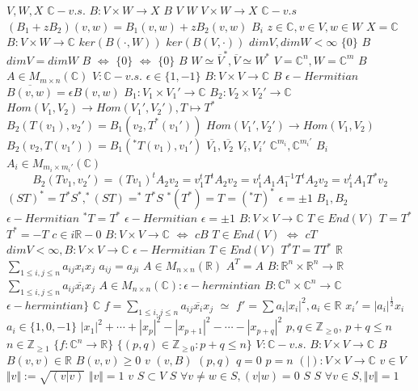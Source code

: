 \documentclass{article}
\begin{document}
$V,W,X$
$\mathbb{C}-v.s.$
$B:V\times W\rightarrow X$
$B$
$V$
$W$
$V\times W \rightarrow X$
$\mathbb{C}-v.s$
$(B_1+zB_2)(v,w)=B_1(v,w)+zB_2(v,w)$
$B_i$
$z \in \mathbb{C},v\in V,w\in W$
$X=\mathbb{C}$
$B:V\times W \rightarrow \mathbb{C}$
$ker(B(\cdot,W))$
$ker(B(V,\cdot))$
$dimV,dimW<\infty$
$\{0\}$
$B$
$dimV=dimW$
$B$
$\Longleftrightarrow$
$\{0\}$
$\Longleftrightarrow$
$\{0\}$
$B$
$W\simeq \overline{V}^*,\overline{V}\simeq W^*$
$V=\mathbb{C}^n,W=\mathbb{C}^m$
$B$
$A\in M_{m\times n}(\mathbb{C})$
$V:\mathbb{C}-v.s.$
$\epsilon\in \{1,-1\}$
$B:V\times V\rightarrow \mathbb{C}$
$B$
$\epsilon-Hermitian$
$\overline{B(v,w)}=\epsilon B(v,w)$
$B_1:V_1\times V_1' \rightarrow \mathbb{C}$
$B_2:V_2\times V_2' \rightarrow \mathbb{C}$
$Hom(V_1,V_2) \rightarrow Hom(V_1',V_2'),T\mapsto T^*$
$B_2(T(v_1),v_2')=B_1(v_2,T^*(v_1'))$
$Hom(V_1',V_2')\rightarrow Hom(V_1,V_2)$
$B_2(v_2, T(v_1'))=B_1(^*T(v_1),v_1')$
$\overline{V_1},\overline{V_2}$
$V_i,V_i'$
$\mathbb{C}^{m_i},\mathbb{C}^{m_i'}$
$B_i$
$A_i \in M_{m_i\times m_i'}(\mathbb{C})$
$$B_2(Tv_1,v_2')=(Tv_1)^tA_2v_2=v_1^tT^tA_2v_2=v_1^tA_1A_1^{-1}T^tA_2v_2=v_1^tA_1T^*v_2$$
$(ST)^*=T^*S^*,^*(ST)=^*T^*S$
$^*(T^*)=T=(^*T)^*$
$\epsilon=\pm 1$
$B_1,B_2$
$\epsilon-Hermitian$
$^*T=T^*$
$\epsilon-Hermitian$
$\epsilon=\pm1$
$B:V\times V\rightarrow \mathbb{C}$
$T\in End(V)$
$T=T^*$
$T^*=-T$
$c\in i\mathbb{R}-{0}$
$B:V\times V \rightarrow \mathbb{C}$
$\Longleftrightarrow$
$cB$
$T \in End(V)$
$\Longleftrightarrow$
$cT$
$dimV<\infty, B:V\times V\rightarrow \mathbb{C}$
$\epsilon-Hermitian$
$T\in End(V)$
$T^*T=TT^*$
$\mathbb{R}$
$\sum\limits_{1\leq i,j\leq n}a_{ij}x_ix_j$
$a_{ij}=a_{ji}$
$A\in M_{n\times n}(\mathbb{R})$
$A^T=A$
$B:\mathbb{R}^n\times\mathbb{R}^n\rightarrow\mathbb{R}$
$\sum\limits_{1\leq i,j\leq n}a_{ij}\overline{x_i}x_j$
$A\in M_{n\times n}(\mathbb{C}): \epsilon-hermintian$
$B:\mathbb{C}^n\times\mathbb{C}^n\rightarrow\mathbb{C}$
$\epsilon-hermintian\}$
$\mathbb{C}$
$f=\sum\limits_{1\leq i,j\leq n}a_{ij}\overline{x_i}x_j$
$\simeq$
$f'=\sum a_i |x_i|^2,a_i\in \mathbb{R}$
$x_i'=|a_i|^{\frac{1}{2}}x_i$
$a_i\in\{1,0,-1\}$
$|x_1|^2+\cdots+|x_p|^2-|x_{p+1}|^2-\cdots-|x_{p+q}|^2$
$p,q\in \mathbb{Z}_{\geq 0},\,p+q\leq n$
$n\in \mathbb{Z}_{\geq 1}$
$\{f:\mathbb{C}^n \rightarrow \mathbb{R}\}$
$\{(p,q)\in\mathbb{Z}_{\geq0}:p+q\leq n\}$
$V:\mathbb{C}-v.s.$
$B:V\times V\rightarrow \mathbb{C}$
$B$
$B(v,v)\in \mathbb{R}$
$B(v,v)\geq 0$
$v$
$(v,B)$
$(p,q)$
$q=0$
$p=n$
$(|):V \times V \rightarrow \mathbb{C}$
$v\in V$
$\Vert v \Vert := \sqrt{(v \vert v)}$
$\Vert v \Vert =1$
$v$
$S \subset V$
$S$
$\forall v\neq w \in S, (v \vert w)=0$
$S$
$S$
$\forall v\in S, \Vert v \Vert =1$
\end{document}
